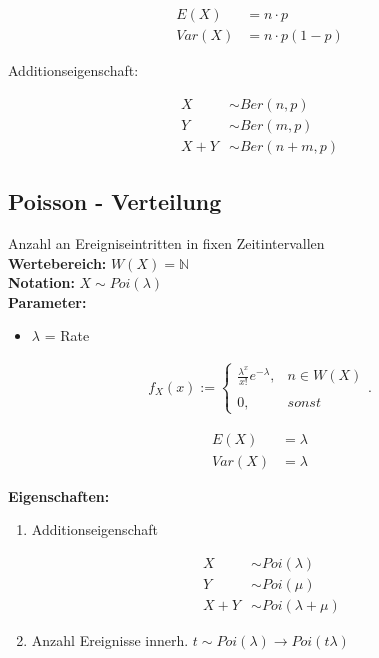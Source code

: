 \documentclass[10pt,a4paper]{article}
\begin{document}
  \begin{mdframed}[style=exercise]
    \begin{align}
        E(X) &= n\cdot p \\
        Var(X) &= n\cdot p (1-p) 
    \end{align}
  \end{mdframed}
  Additionseigenschaft:
  \begin{mdframed}[style=exercise]
    \begin{align}
        X   &\sim Ber(n,p)\\
        Y   &\sim Ber(m,p)\\
        X+Y &\sim Ber(n+m,p)
    \end{align}
  \end{mdframed}

\subsection{Poisson - Verteilung}
Anzahl an Ereigniseintritten in fixen Zeitintervallen \\
\textbf{Wertebereich:} $W(X)= \mathbb{N}$ \\
\textbf{Notation:} $X \sim Poi(\lambda)$ \\
\textbf{Parameter:} \begin{itemize}
    \item $\lambda$ = Rate
\end{itemize}

  \begin{mdframed}[style=exercise]
    \begin{align}
        f_X(x):=\left\{\begin{array}{ll} \frac{\lambda^x}{x!} e^{-\lambda}, & n \in W(X) \\ \\
        0, & sonst \end{array}\right. .
    \end{align}
  \end{mdframed}

  \begin{mdframed}[style=exercise]
    \begin{align}
        E(X) &= \lambda \\
        Var(X) &= \lambda 
    \end{align}
  \end{mdframed}
\textbf{Eigenschaften:}
\begin{enumerate}
    \item Additionseigenschaft
  \begin{mdframed}[style=exercise]
    \begin{align}
        X   &\sim Poi(\lambda)\\
        Y   &\sim Poi(\mu)\\
        X+Y &\sim Poi(\lambda+\mu)
    \end{align}
  \end{mdframed}
  \item Anzahl Ereignisse innerh. $t\sim Poi(\lambda) \rightarrow Poi(t\lambda)$ 
\end{enumerate}
\end{document}
